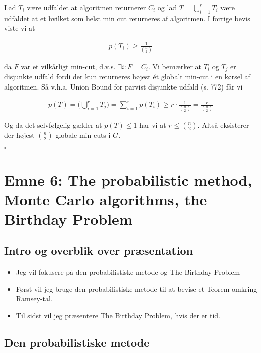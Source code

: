 \documentclass[12pt]{article}
\begin{document}
Lad $T_i$ være udfaldet at algoritmen returnerer $C_i$ og lad $T=\bigcup_{i=1}^r T_i$ være udfaldet at et hvilket som helst min cut returneres af algoritmen. I forrige bevis viste vi at 

\begin{align*}
    p(T_i)  \ge \frac{1}{\binom{n}{2}}
\end{align*}    

da $F$ var et vilkårligt min-cut, d.v.s. $\exists i: F=C_i$. Vi bemærker at $T_i$ og $T_j$ er disjunkte udfald fordi der kun returneres højest ét globalt min-cut i en kørsel af algoritmen. Så v.h.a. Union Bound for parvist disjunkte udfald (s. 772) får vi 

\begin{align*}
    p(T)=\bigg(\bigcup_{i=1}^r T_j \bigg) = \sum_{i=1}^r p(T_i) \ge r \cdot \frac{1}{\binom{n}{2}} = \frac{r}{\binom{n}{2}}     
\end{align*}

Og da det selvfølgelig gælder at $p(T)\le 1$ har vi at $r \le \binom{n}{2}$. Altså eksisterer der højest $\binom{n}{2}$ globale min-cuts i $G$.

\begin{flushright}
    $\square$
\end{flushright}

\newpage

\section{Emne 6: The probabilistic method, Monte Carlo algorithms, the Birthday Problem}

\subsection*{Intro og overblik over præsentation}

\begin{itemize}
    \item Jeg vil fokusere på den probabilistiske metode og The Birthday Problem
    \item Først vil jeg bruge den probabilistiske metode til at bevise et Teorem omkring Ramsey-tal. 
    \item Til sidst vil jeg præsentere The Birthday Problem, hvis der er tid. 
\end{itemize}

\subsection*{Den probabilistiske metode}
\end{document}
